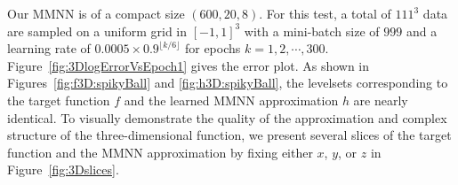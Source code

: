\documentclass[review,hidelinks,onefignum,onetabnum]{siamart250211}
\begin{document}
Our MMNN is of a compact size $(600, 20, 8)$. For this test, a total of $111^3$ data are sampled on a uniform grid in $[-1,1]^3$ with a mini-batch size of $999$ and a learning rate of $0.0005 \times 0.9^{\lfloor k/6 \rfloor}$ for epochs $k=1,2,\cdots,300$.
Figure~\ref{fig:3DlogErrorVsEpoch1} gives the error plot. 
As shown in Figures~\ref{fig:f3D:spikyBall} and \ref{fig:h3D:spikyBall}, the levelsets corresponding to the target function $f$ and the learned MMNN approximation $h$ are nearly identical.
To visually demonstrate the quality of the approximation and complex structure of the three-dimensional function, we present several slices of the target function and the MMNN approximation by fixing either $x$, $y$, or $z$ in Figure~\ref{fig:3Dslices}.
\end{document}
